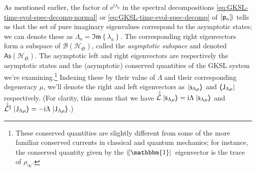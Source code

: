 \documentclass[preprints,article,accept,moreauthors,pdftex]{Definitions/mdpi}
\begin{document}
\begin{paracol}{2}
As mentioned earlier, the factor of $\mathrm{e}^{t\lambda_{a}}$ in the spectral decompositions  \eqref{eq:GKSL-time-evol-spec-decomp-normal} or \eqref{eq:GKSL-time-evol-spec-decomp} of $\left.\ket{\mathsf{p}_{a}}\!\right\rangle$ tells us that the set of pure imaginary eigenvalues correspond to the asymptotic states; we can denote these as $\Lambda_{a} = \mathfrak{Im}\left\{\lambda_{a}\right\}$. The corresponding right eigenvectors form a subspace of $\mathcal{B}\left(\mathcal{H}_{\mathfrak{S}}\right)$, called the \emph{asymptotic subspace} and denoted $\mathsf{As}\left(\mathcal{H}_{\mathfrak{S}}\right)$. The asymptotic left and right eigenvectors are respectively the asymptotic states and the (asymptotic) conserved quantities of the GKSL system we're examining.\footnote{These conserved quantities are slightly different from some of the more familiar conserved currents in classical and quantum mechanics; for instance, the conserved quantity given by the $\left\langle\!\bra{\mathbbm{1}}\right.$ eigenvector is the trace of $\rho_{\infty}$.} Indexing these by their value of $\Lambda$ and their corresponding degeneracy $\mu$, we'll denote the right and left eigenvectors as $\left.\ket{\mathsf{s}_{\Lambda\mu}}\!\!\right\rangle$ and $\left\langle\!\!\bra{\mathsf{J}_{\Lambda\mu}}\right.$ respectively. (For clarity, this means that we have $\hat{\hat{\mathcal{L}}}\left.\ket{\mathsf{s}_{\Lambda\mu}}\!\!\right\rangle = \mathrm{i}\Lambda\left.\ket{\mathsf{s}_{\Lambda\mu}}\!\!\right\rangle$ and $\hat{\hat{\mathcal{L}}}^{\ddagger}\left.\ket{\mathsf{J}_{\Lambda\mu}}\!\!\right\rangle = -\mathrm{i}\Lambda\left.\ket{\mathsf{J}_{\Lambda\mu}}\!\!\right\rangle$.)


\end{paracol}
\end{document}
